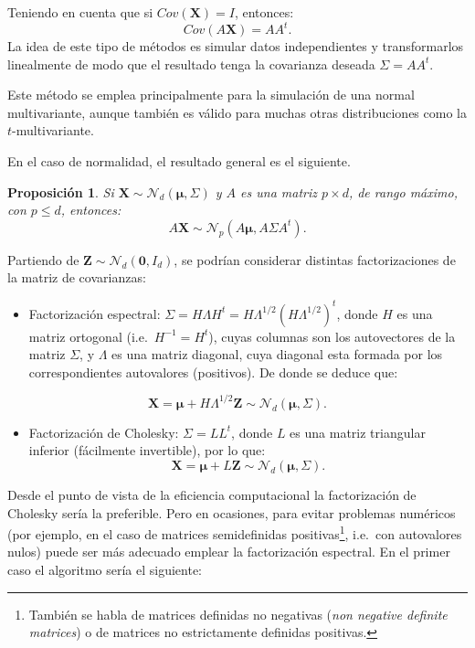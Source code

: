 \documentclass[
]{book}
\providecommand{\tightlist}{%
  \setlength{\itemsep}{0pt}\setlength{\parskip}{0pt}}
\theoremstyle{break}
\newtheorem{proposition}{Proposición}[chapter]
\theoremstyle{nonumberplain}
\begin{document}
Teniendo en cuenta que si \(Cov(\mathbf{X})= I\), entonces:
\[Cov(A\mathbf{X}) = AA^t.\]
La idea de este tipo de métodos es simular datos independientes y transformarlos linealmente de modo que el resultado tenga la covarianza deseada \(\Sigma = AA^t\).

Este método se emplea principalmente para la simulación de una
normal multivariante, aunque también es válido para muchas otras
distribuciones como la \(t\)-multivariante.

En el caso de normalidad, el resultado general es el siguiente.

\begin{proposition}
Si \(\mathbf{X} \sim \mathcal{N}_d\left( \boldsymbol\mu,\Sigma \right)\) y \(A\) es una matriz \(p\times d\), de
rango máximo, con \(p\leq d\), entonces:
\[A\mathbf{X} \sim \mathcal{N}_{p}\left(A\boldsymbol\mu,A\Sigma A^t\right).\]
\end{proposition}

Partiendo de \(\mathbf{Z} \sim \mathcal{N}_d\left( \mathbf{0},I_d\right)\), se podrían considerar distintas factorizaciones de la matriz de covarianzas:

\begin{itemize}
\tightlist
\item
  Factorización espectral:
  \(\Sigma=H\Lambda H^t =H\Lambda^{1/2}(H\Lambda^{1/2})^t\),
  donde \(H\) es una matriz ortogonal (i.e.~\(H^{-1}=H^{t}\)), cuyas columnas son los autovectores de la matriz \(\Sigma\), y \(\Lambda\) es una matriz diagonal, cuya diagonal esta formada por los correspondientes autovalores (positivos). De donde se deduce que:
\end{itemize}

\[\mathbf{X} =\boldsymbol\mu + H\Lambda^{1/2}\mathbf{Z} \sim \mathcal{N}_d\left( \boldsymbol\mu,\Sigma \right).\]

\begin{itemize}
\tightlist
\item
  Factorización de Cholesky: \(\Sigma=LL^t\), donde \(L\) es una matriz triangular inferior (fácilmente invertible), por lo que:
  \[\mathbf{X} =\boldsymbol\mu + L\mathbf{Z} 
  \sim \mathcal{N}_d\left( \boldsymbol\mu,\Sigma \right).\]
\end{itemize}

Desde el punto de vista de la eficiencia computacional la factorización de Cholesky sería la preferible. Pero en ocasiones, para evitar problemas numéricos (por ejemplo, en el caso de matrices semidefinidas positivas\footnote{También se habla de matrices definidas no negativas (\emph{non negative definite matrices}) o de matrices no estrictamente definidas positivas.}, i.e.~con autovalores nulos) puede ser más adecuado emplear la factorización espectral.
En el primer caso el algoritmo sería el siguiente:
\end{document}
